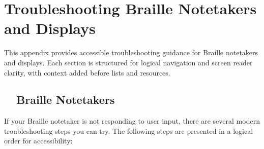 \chapter{Troubleshooting Braille Notetakers and Displays}
\label{app2:trouble2}

\begin{raggedright}
	This appendix provides accessible troubleshooting guidance for Braille notetakers and displays. Each section is structured for logical navigation and screen reader clarity, with context added before lists and resources.
\end{raggedright}

\section{~~Braille Notetakers}
\label{app2:notebook}
If your Braille notetaker is not responding to user input, there are several modern troubleshooting steps you can try. The following steps are presented in a logical order for accessibility:

